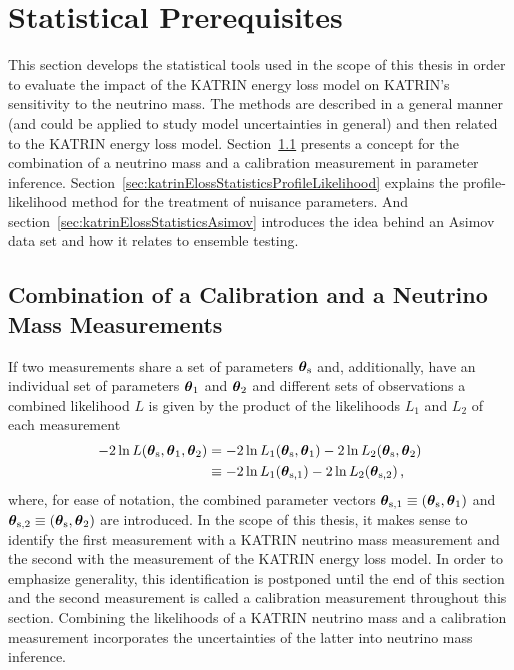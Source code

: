 \def\currentRootFolder{chapter/sensitivityStudyWithPreliminaryKatrinElossModel/statisticalPrerequisites}
\def\currentFigureFolder{\currentRootFolder/fig}



\section{Statistical Prerequisites}
\label{sec:katrinElossStatistics}
This section develops the statistical tools used in the scope of this thesis in order to evaluate the impact of the KATRIN energy loss model on KATRIN's sensitivity to the neutrino mass. The methods are described in a general manner (and could be applied to study model uncertainties in general) and then related to the KATRIN energy loss model. Section~\ref{sec:katrinElossStatisticsCombMeasurements} presents a concept for the combination of a neutrino mass and a calibration measurement in parameter inference. Section~\ref{sec:katrinElossStatisticsProfileLikelihood} explains the profile-likelihood method for the treatment of nuisance parameters. And section~\ref{sec:katrinElossStatisticsAsimov} introduces the idea behind an Asimov data set and how it relates to ensemble testing.

\subsection{Combination of a Calibration and a Neutrino Mass Measurements}
\label{sec:katrinElossStatisticsCombMeasurements}
If two measurements share a set of parameters $\boldsymbol{\mathbf{\theta}}_\mathrm{s}$ and, additionally, have an individual set of parameters $\boldsymbol{\mathbf{\theta}}_1$ and $\boldsymbol{\mathbf{\theta}}_2$ and different sets of observations a combined likelihood $L$ is given by the product of the likelihoods $L_1$ and $L_2$ of each measurement~\cite{ReviewOfParticlePhysics}
\newcommand{\paramVecSOne}{\paramVec_\mathrm{s,1}}
\newcommand{\paramVecSTwo}{\paramVec_\mathrm{s,2}}
\begin{align}
-2\ln L(\paramVecShared, \paramVec_1, \paramVec_2) &=  
-2\ln L_1(\paramVecShared, \paramVec_1)
-2\ln L_2(\paramVecShared, \paramVec_2)
\nonumber \\
&\equiv
-2\ln L_1(\paramVecSOne)
-2\ln L_2(\paramVecSTwo)
\label{eq:katrinElossStatisticsCombinedLikelihood}
\comma
\end{align}
where, for ease of notation, the combined parameter vectors $\boldsymbol{\mathbf{\theta}}_\mathrm{s,1}\equiv(\boldsymbol{\mathbf{\theta}}_\mathrm{s},\boldsymbol{\mathbf{\theta}}_1)$ and 
$\boldsymbol{\mathbf{\theta}}_\mathrm{s,2}\equiv(\boldsymbol{\mathbf{\theta}}_\mathrm{s},\boldsymbol{\mathbf{\theta}}_2)$ are introduced. In the scope of this thesis, it makes sense to identify the first measurement with a KATRIN neutrino mass measurement and the second with the measurement of the KATRIN energy loss model. In order to emphasize generality, this identification is postponed until the end of this section and the second measurement is called a calibration measurement throughout this section. Combining the likelihoods of a KATRIN neutrino mass and a calibration measurement incorporates the uncertainties of the latter into neutrino mass inference. 

